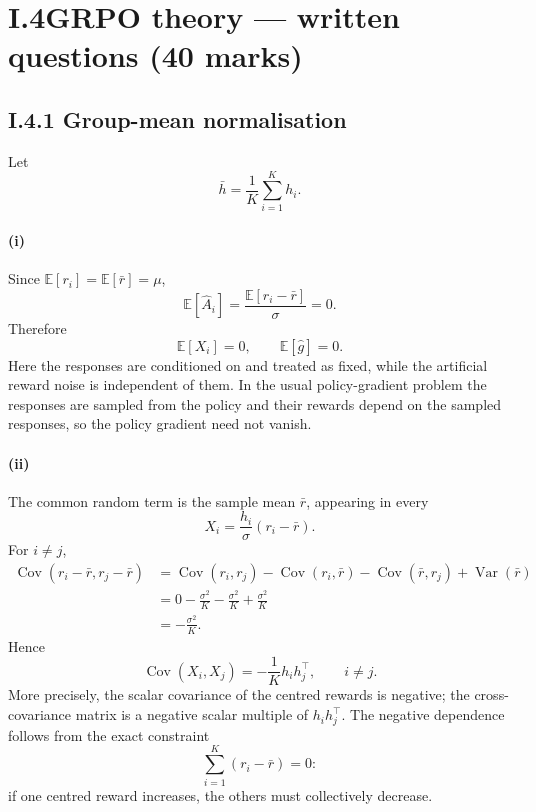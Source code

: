 \documentclass[11pt]{article}
\begin{document}
\clearpage
\section*{I.4\quad GRPO theory --- written questions (40 marks)}

\subsection*{I.4.1 Group-mean normalisation}

Let
\[
\bar h=\frac{1}{K}\sum_{i=1}^K h_i.
\]

\paragraph{(i)}
Since $\mathbb{E}[r_i]=\mathbb{E}[\bar r]=\mu$,
\[
\mathbb{E}[\hat A_i]
=
\frac{\mathbb{E}[r_i-\bar r]}{\sigma}
=0.
\]
Therefore
\[
\boxed{\mathbb{E}[X_i]=0},
\qquad
\boxed{\mathbb{E}[\hat g]=0}.
\]
Here the responses are conditioned on and treated as fixed, while the artificial
reward noise is independent of them. In the usual policy-gradient problem the
responses are sampled from the policy and their rewards depend on the sampled
responses, so the policy gradient need not vanish.

\paragraph{(ii)}
The common random term is the sample mean $\bar r$, appearing in every
\[
X_i=\frac{h_i}{\sigma}(r_i-\bar r).
\]
For $i\neq j$,
\begin{align*}
\operatorname{Cov}(r_i-\bar r,r_j-\bar r)
&=
\operatorname{Cov}(r_i,r_j)
-\operatorname{Cov}(r_i,\bar r)
-\operatorname{Cov}(\bar r,r_j)
+\operatorname{Var}(\bar r)\\
&=
0-\frac{\sigma^2}{K}-\frac{\sigma^2}{K}
+\frac{\sigma^2}{K}\\
&=
-\frac{\sigma^2}{K}.
\end{align*}
Hence
\[
\boxed{
\operatorname{Cov}(X_i,X_j)
=
-\frac{1}{K}h_i h_j^\top,
\qquad i\neq j.
}
\]
More precisely, the scalar covariance of the centred rewards is negative; the
cross-covariance matrix is a negative scalar multiple of $h_i h_j^\top$.
The negative dependence follows from the exact constraint
\[
\sum_{i=1}^K(r_i-\bar r)=0:
\]
if one centred reward increases, the others must collectively decrease.
\end{document}
